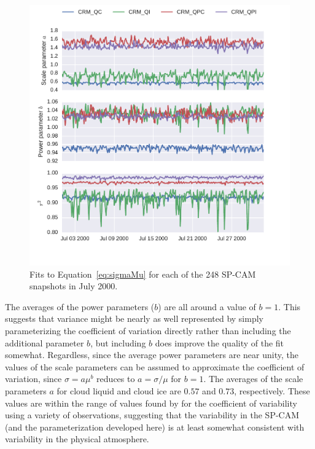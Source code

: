 \begin{figure}[htbp]
\centering
\includegraphics{graphics/subgrid2_mxratio_variance_fits.pdf}
\caption{\label{fig:subgrid2_mxratio_variance_fits}Fits to
Equation~\ref{eq:sigmaMu} for each of the 248 SP-CAM snapshots in July
2000.}\label{fig:subgrid2ux5fmxratioux5fvarianceux5ffits}
\end{figure}

The averages of the power parameters (\(b\)) are all around a value of
\(b = 1\). This suggests that variance might be nearly as well
represented by simply parameterizing the coefficient of variation
directly rather than including the additional parameter \(b\), but
including \(b\) does improve the quality of the fit somewhat.
Regardless, since the average power parameters are near unity, the
values of the scale parameters can be assumed to approximate the
coefficient of variation, since \(\sigma = a \mu^b\) reduces to
\(a = \sigma / \mu\) for \(b = 1\). The averages of the scale parameters
\(a\) for cloud liquid and cloud ice are \(0.57\) and \(0.73\),
respectively. These values are within the range of values found by
\citet{shonk_et_al_2010} for the coefficient of variability using a
variety of observations, suggesting that the variability in the SP-CAM
(and the parameterization developed here) is at least somewhat
consistent with variability in the physical atmosphere.

